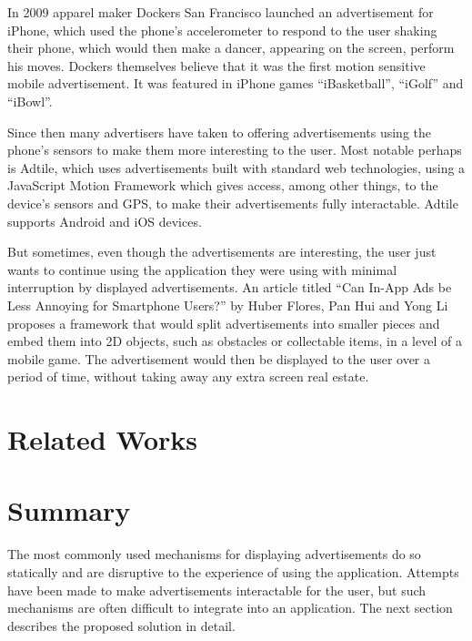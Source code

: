 In 2009 apparel maker Dockers San Francisco launched an advertisement for iPhone, which used the phone’s accelerometer to respond to the user shaking their phone, which would then make a dancer, appearing on the screen, perform his moves. Dockers themselves believe that it was the first motion sensitive mobile advertisement. It was featured in iPhone games “iBasketball”, “iGolf” and “iBowl”.\cite{dockers}

Since then many advertisers have taken to offering advertisements using the phone’s sensors to make them more interesting to the user. Most notable perhaps is Adtile, which uses advertisements built with standard web technologies, using a JavaScript Motion Framework which gives access, among other things, to the device’s sensors and GPS, to make their advertisements fully interactable. Adtile supports Android and iOS devices. \cite{adtile}

But sometimes, even though the advertisements are interesting, the user just wants to continue using the application they were using with minimal interruption by displayed advertisements. An article titled “Can In-App Ads be Less Annoying for Smartphone Users?” by Huber Flores, Pan Hui and Yong Li proposes a framework that would split advertisements into smaller pieces and embed them into 2D objects, such as obstacles or collectable items, in a level of a mobile game. The advertisement would then be displayed to the user over a period of time, without taking away any extra screen real estate. \cite{gesture-ads}

\section{Related Works}

\section{Summary}

The most commonly used mechanisms for displaying advertisements do so statically and are disruptive to the experience of using the application. Attempts have been made to make advertisements interactable for the user, but such mechanisms are often difficult to integrate into an application. The next section describes the proposed solution in detail.